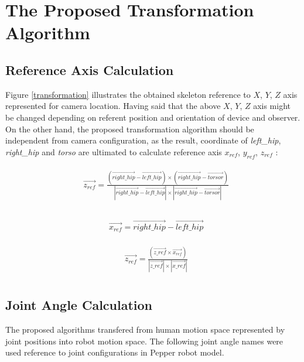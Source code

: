 \section{The Proposed Transformation Algorithm}

\subsection{Reference Axis Calculation}

Figure \ref{transformation} illustrates the obtained skeleton reference to $X$, $Y$, $Z$ axis represented for camera location. Having said that the above $X$, $Y$, $Z$ axis might be changed depending on referent position and orientation of device and observer. On the other hand, the proposed transformation algorithm should be independent from camera configuration, as the result, coordinate of \textit{left\_hip}, \textit{right\_hip} and \textit{torso} are ultimated to calculate reference axis $x_{ref}$, $y_{ref}$, $z_{ref}$ :

\begin{align}
\begin{split}
& \vec{z_{ref}} = \frac{(\vec{right\_hip} - \vec{left\_hip}) \times (\vec{right\_hip} - \vec{torsor})}{|\vec{right\_hip} - \vec{left\_hip}| \times |\vec{right\_hip} - \vec{torsor}|} \\
\end{split}
\end{align}

\begin{align}
\begin{split}
& \vec{x_{ref}} = \vec{right\_hip} - \vec{left\_hip}
\end{split}
\end{align}

\begin{align}
\begin{split}
& \vec{z_{ref}} = \frac{( \vec{z\_{ref}} \times \vec{x_{ref}})} {|\vec{z\_{ref}}| \times |\vec{x\_{ref}}|} \\
\end{split}
\end{align}

\subsection{Joint Angle Calculation}
The proposed algorithms transfered from human motion space represented by joint positions into robot motion space. The following joint angle names were used reference to joint configurations in Pepper robot model.
 
